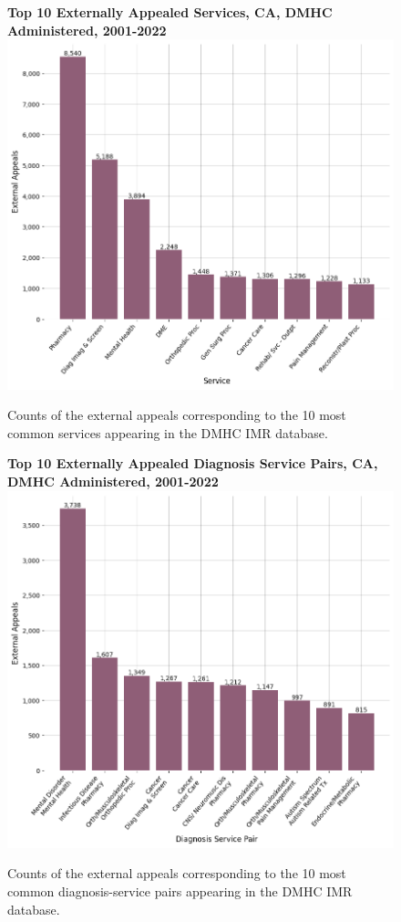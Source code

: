 \documentclass[12pt, a4paper,twoside]{report}
\theoremstyle{plain} %
\theoremstyle{definition} %
\theoremstyle{remark} %
\numberwithin{equation}{chapter}
\begin{document}
		
		\begin{figure}[h!]
			\centering
			\textbf{Top 10 Externally Appealed Services, CA, DMHC Administered, 2001-2022}
			\includegraphics[width=.8\textwidth]{images/ca_dmhc_external_appeals/top_externally_appealed_treatments.png}
			\caption{Counts of the external appeals corresponding to the 10 most common services appearing in the DMHC IMR database.}
			\label{cadmhcexternalappealsbyservice}
		\end{figure}
		
		\begin{figure}[h!]
			\centering
			\textbf{Top 10 Externally Appealed Diagnosis Service Pairs, CA, DMHC Administered, 2001-2022}
			\includegraphics[width=.8\textwidth]{images/ca_dmhc_external_appeals/top_appealed_diag_services.png}
			\caption{Counts of the external appeals corresponding to the 10 most common diagnosis-service pairs appearing in the DMHC IMR database.}
			\label{cadmhcexternalappealsbydiagservice}
		\end{figure}
		
\end{document}
